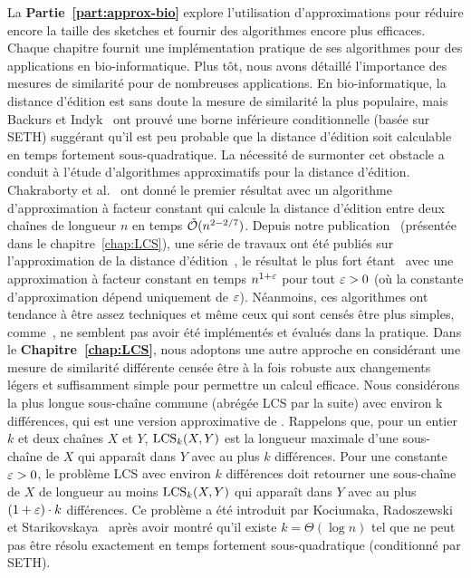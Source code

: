 La \textbf{Partie~\ref{part:approx-bio}} explore l'utilisation d'approximations pour réduire encore la taille des sketches et fournir des algorithmes encore plus efficaces. Chaque chapitre fournit une implémentation pratique de ses algorithmes pour des applications en bio-informatique.
%
Plus tôt, nous avons détaillé l'importance des mesures de similarité pour de nombreuses applications.
%
En bio-informatique, la distance d'édition est sans doute la mesure de similarité la plus populaire, mais Backurs et Indyk~\cite{DBLP:conf/stoc/BackursI15} ont prouvé une borne inférieure conditionnelle (basée sur SETH) suggérant qu'il est peu probable que la distance d'édition soit calculable en temps fortement sous-quadratique.
%
La nécessité de surmonter cet obstacle a conduit à l'étude d'algorithmes approximatifs pour la distance d'édition. Chakraborty et al.~\cite{DBLP:conf/focs/ChakrabortyDGKS18} ont donné le premier résultat  avec un algorithme d'approximation à facteur constant qui calcule la distance d'édition entre deux chaînes de longueur $n$ en temps $\tilde{\mathcal{O}}(n^{2-2/7})$.
Depuis notre publication~\cite{DBLP:conf/cpm/GourdelKRS20} (présentée dans le chapitre~\ref{chap:LCS}), une série de travaux ont été publiés sur l'approximation de la distance d'édition~\cite{brakensiek2020constant,koucky2020constant}, le résultat le plus fort étant~\cite{andoni2020edit} avec une approximation à facteur constant en temps $n^{1+\varepsilon}$ pour tout $\varepsilon>0$ (où la constante d'approximation dépend uniquement de $\varepsilon$).
Néanmoins, ces algorithmes ont tendance à être assez techniques et même ceux qui sont censés être plus simples, comme~\cite{andoni2020simple}, ne semblent pas avoir été implémentés et évalués dans la pratique.
%
Dans le \textbf{Chapitre~\ref{chap:LCS}}, nous adoptons une autre approche en considérant une mesure de similarité différente censée être à la fois robuste aux  changements légers et suffisamment simple pour permettre un calcul efficace. Nous considérons la plus longue sous-chaîne commune (abrégée LCS par la suite) avec environ k différences, qui est une version approximative de \kLCS. Rappelons que, pour un entier $k$ et deux chaînes $X$ et $Y$, $\mathrm{LCS}_{k}(X,Y)$ est la longueur maximale d'une sous-chaîne de $X$ qui apparaît dans $Y$ avec au plus $k$ différences.
Pour une constante $\varepsilon > 0$, le problème LCS avec environ $k$ différences doit retourner une sous-chaîne de $X$ de longueur au moins $\mathrm{LCS}_{k}(X,Y)$ qui apparaît dans $Y$ avec au plus $(1+\varepsilon) \cdot k$ différences. Ce problème a été introduit par Kociumaka, Radoszewski et Starikovskaya~\cite{DBLP:journals/algorithmica/KociumakaRS19} après avoir montré qu'il existe $k=\Theta(\log n)$ tel que \kLCS ne peut pas être résolu exactement en temps fortement sous-quadratique (conditionné par SETH).
